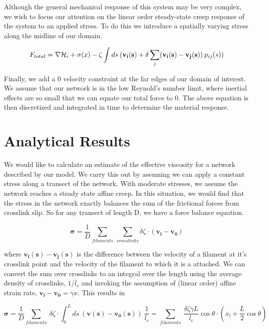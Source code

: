 \documentclass[prb,11pt]{revtex4-1}
\begin{document}
Although the general mechanical response of this system may be very complex, we wish to focus our attention on the linear order steady-state creep response of the system to an applied stress.  To do this we introduce a spatially varying stress along the midline of our domain.

\begin{equation}
F_{total}= \nabla {\cal H}_i + \sigma(x)-\zeta \int ds \: (\mathbf{v_i(s)} + \delta \sum _j(\mathbf{v_i(s)}-\mathbf{v_j(s)}) \: p_{ij}(s)) 
\end{equation}

Finally, we add a 0 velocity constraint at the far edges of our domain of interest.  We assume that our network is in the low Reynold's number limit, where inertial effects are so small that we can equate our total force to 0.  The above equation is then discretized and integrated in time to determine the material response.

\section{Analytical Results}
We would like to calculate an estimate of the effective viscosity for a network described by our model.  We carry this out by assuming we can apply a constant stress along a transect of the network.  With moderate stresses, we assume the network reaches a steady state affine creep. In this situation, we would find that the stress in the network exactly balances the sum of the frictional forces from crosslink slip.  So for any transect of length D, we have a force balance equation.

\begin{equation}
\mathbf{\sigma} = \frac{1}{D}\sum_{filaments}\: \sum_{crosslinks}\delta \zeta \cdot (\mathbf{v_i}-\mathbf{v_0})
\end{equation}

where $\mathbf{v_i(s)}-\mathbf{v_j(s)}$ is the difference between the velocity of a filament at it's crosslink point and the velocity of the filament to which it is a attached. We can convert the sum over crosslinks to an integral over the length using the average density of crosslinks, $1/l_c$ and invoking the assumption of (linear order) affine strain rate, $\mathbf{v_i}-\mathbf{v_0}=\dot \gamma x$. This results in

\begin{equation}
\mathbf{\sigma} =  \frac{1}{D}\sum_{filaments}\:  \delta \zeta \cdot \int_0^L ds \: (\mathbf{v(s)}-\mathbf{v_0(s)}) \:\frac{1}{l_c} = \sum_{filaments}\:  \frac{\delta \zeta \dot \gamma L}{l_c} \cos \theta \cdot (x_l + \frac{L}{2} \cos \theta)
\end{equation}
\end{document}
